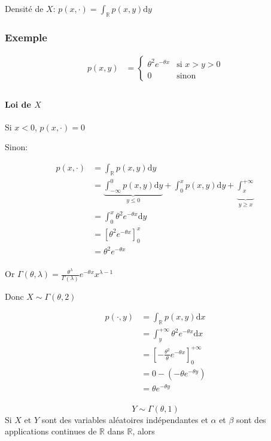 \documentclass{article}
\newcommand{\R}{\mathbb{R}}
\newcommand{\dx}{\mathrm{d}x}
\newcommand{\dy}{\mathrm{d}y}
\begin{document}
Densité de $X$: $p(x, \cdot) = \int_{\R} p(x, y) \mathrm{d}y$

\subsubsection{Exemple}

\begin{align*}
	p(x, y) &= \begin{cases}
		\theta^2 e^{-\theta x} &\text{si } x> y> 0 \\
		0 &\text{sinon}
	\end{cases} \\
\end{align*}

\paragraph{Loi de $X$}

Si $x<0$,  $p(x,  \cdot ) = 0$

Sinon:

\begin{align*}
	p(x,  \cdot ) &= \int_{\R} p(x, y) \dy \\
		      &= \underbrace{\int_{-\infty}^{0} p(x, y)\dy }_{y\le 0} + \int_{0}^{x} p(x, y)\dy + \underbrace{\int_x^{+\infty}}_{y\ge x} \\
		      &= \int_0^x \theta^2 e^{-\theta x} \dy \\
		      &= \left[ \theta^2 e^{-\theta x} \right]_0^x \\
		      &= \theta^2 e^{-\theta x} \\
\end{align*}

Or $\Gamma(\theta, \lambda) = \frac{\theta^{\lambda}}{\Gamma(\lambda)} e^{-\theta x} x^{\lambda-1} $

Donc $X \sim \Gamma(\theta, 2)$

\begin{align*}
	p( \cdot , y) &= \int_{\R} p(x, y)\dx \\
	&= \int_y^{+\infty} \theta^2 e^{-\theta x} \dx \\
	&= \left[ -\frac{\theta^2}{\theta} e^{-\theta x} \right]_{0}^{+\infty} \\
	&= 0 - (-\theta e^{-\theta y}) \\
	&= \theta e^{-\theta y} \\
\end{align*}

\[
	Y \sim \Gamma(\theta, 1)
\] 
Si $X$ et $Y$ sont des variables aléatoires indépendantes et $\alpha$ et $\beta$ sont des applications continues de $\R$ dans $\R$, alors 
\end{document}
